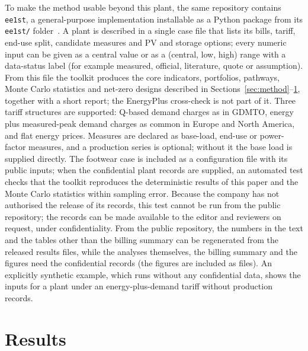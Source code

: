 \documentclass[processes,article,submit,pdftex,moreauthors]{Definitions/mdpi}
\begin{document}
To make the method usable beyond this plant, the same repository contains \texttt{ee1st}, a general-purpose implementation installable as a Python package from its \texttt{ee1st/} folder~\cite{ee1st2026}. A plant is described in a single case file that lists its bills, tariff, end-use split, candidate measures and PV and storage options; every numeric input can be given as a central value or as a (central, low, high) range with a data-status label (for example measured, official, literature, quote or assumption). From this file the toolkit produces the core indicators, portfolios, pathways, Monte Carlo statistics and net-zero designs described in Sections~\ref{sec:method}--\ref{sec:results}, together with a short report; the EnergyPlus cross-check is not part of it. Three tariff structures are supported: Q-based demand charges as in GDMTO, energy plus measured-peak demand charges as common in Europe and North America, and flat energy prices. Measures are declared as base-load, end-use or power-factor measures, and a production series is optional; without it the base load is supplied directly. The footwear case is included as a configuration file with its public inputs; when the confidential plant records are supplied, an automated test checks that the toolkit reproduces the deterministic results of this paper and the Monte Carlo statistics within sampling error. Because the company has not authorised the release of its records, this test cannot be run from the public repository; the records can be made available to the editor and reviewers on request, under confidentiality. From the public repository, the numbers in the text and the tables other than the billing summary can be regenerated from the released results files, while the analyses themselves, the billing summary and the figures need the confidential records (the figures are included as files). An explicitly synthetic example, which runs without any confidential data, shows the inputs for a plant under an energy-plus-demand tariff without production records.

\section{Results}
\label{sec:results}
\end{document}
